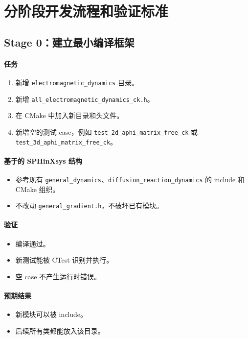 \documentclass[UTF8,a4paper,11pt]{ctexart}
\newcommand{\code}[1]{\texttt{#1}}
\begin{document}
\section{分阶段开发流程和验证标准}

\subsection{Stage 0：建立最小编译框架}

\paragraph{任务}
\begin{enumerate}
  \item 新增 \code{electromagnetic\_dynamics} 目录。
  \item 新增 \code{all\_electromagnetic\_dynamics\_ck.h}。
  \item 在 CMake 中加入新目录和头文件。
  \item 新增空的测试 case，例如 \code{test\_2d\_aphi\_matrix\_free\_ck} 或 \code{test\_3d\_aphi\_matrix\_free\_ck}。
\end{enumerate}

\paragraph{基于的 SPHinXsys 结构}
\begin{itemize}
  \item 参考现有 \code{general\_dynamics}、\code{diffusion\_reaction\_dynamics} 的 include 和 CMake 组织。
  \item 不改动 \code{general\_gradient.h}，不破坏已有模块。
\end{itemize}

\paragraph{验证}
\begin{itemize}
  \item 编译通过。
  \item 新测试能被 CTest 识别并执行。
  \item 空 case 不产生运行时错误。
\end{itemize}

\paragraph{预期结果}
\begin{itemize}
  \item 新模块可以被 include。
  \item 后续所有类都能放入该目录。
\end{itemize}
\end{document}
